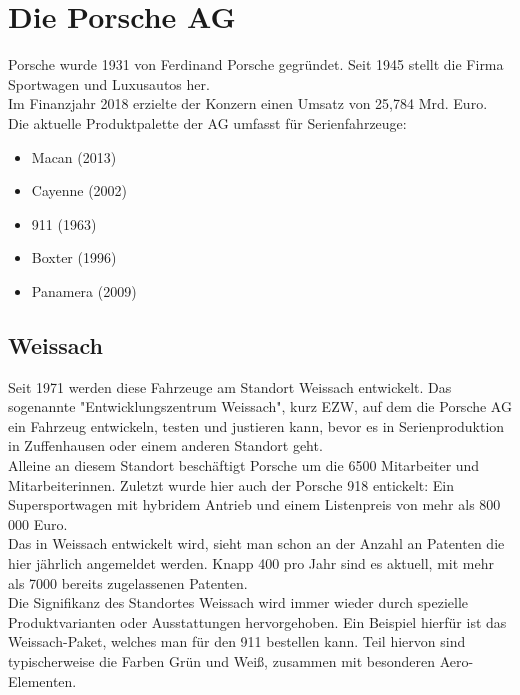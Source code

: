 \chapter{Die Porsche AG}
\label{chap:Intro}

Porsche wurde 1931 von Ferdinand Porsche gegründet. Seit 1945 stellt die Firma Sportwagen und Luxusautos her.\\
Im Finanzjahr 2018 erzielte der Konzern einen Umsatz von 25,784 Mrd. Euro.\\ %
Die aktuelle Produktpalette der AG umfasst für Serienfahrzeuge:\\

\begin{itemize}
	\item{Macan (2013)}
	\item{Cayenne (2002)}
	\item{911 (1963)}
	\item{Boxter (1996)}
	\item{Panamera (2009)}
 \end{itemize}

\section*{Weissach}

Seit 1971 werden diese Fahrzeuge am Standort Weissach entwickelt. Das sogenannte "Entwicklungszentrum Weissach", kurz EZW, auf dem die Porsche AG ein Fahrzeug entwickeln, testen und justieren kann, bevor es in Serienproduktion in Zuffenhausen oder einem anderen Standort geht. \\
Alleine an diesem Standort beschäftigt Porsche um die 6500 Mitarbeiter und Mitarbeiterinnen. Zuletzt wurde hier auch der Porsche 918 entickelt: Ein Supersportwagen mit hybridem Antrieb und einem Listenpreis von mehr als 800 000 Euro.\\
Das in Weissach entwickelt wird, sieht man schon an der Anzahl an Patenten die hier jährlich angemeldet werden. Knapp 400 pro Jahr sind es aktuell, mit mehr als 7000 bereits zugelassenen Patenten.\\
Die Signifikanz des Standortes Weissach wird immer wieder durch spezielle Produktvarianten oder Ausstattungen hervorgehoben. Ein Beispiel hierfür ist das Weissach-Paket, welches man für den 911 bestellen kann. Teil hiervon sind typischerweise die Farben Grün und Weiß, zusammen mit besonderen Aero-Elementen.



